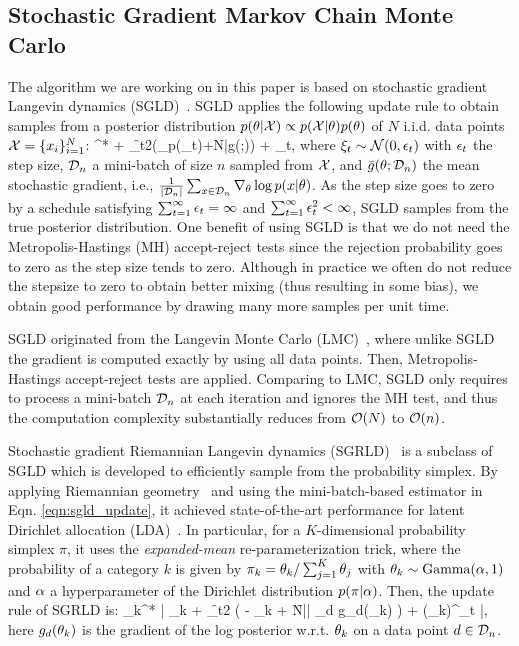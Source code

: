 \subsection{Stochastic Gradient Markov Chain Monte Carlo}
The algorithm we are working on in this paper is based on stochastic gradient Langevin dynamics (SGLD)~\cite{welling2011bayesian}. SGLD applies the following update rule to obtain samples from a posterior distribution $p(\ta|\cX) \propto p(\cX|\ta) p(\ta)$ of $N$ i.i.d. data points $\cX=\{x_i\}_{i=1}^{N}$:
\bea
\ta^* \law \ta + \f{\epsilon_t}{2}\left(\nabla_{\ta}\log p(\ta_t)+N\bar{g}(\ta;\SGLDMinibatch)\right) + \xi_t, \label{eqn:sgld_update}
\eea
where $\xi_t \sim \cN(0,\epsilon_t )$ with $\epsilon_t$ the step size, $\SGLDMinibatch$ a mini-batch of size $n$ sampled from $\cX$, and $\bar{g}(\ta;\SGLDMinibatch)$ the mean stochastic gradient, i.e., $\frac{1}{|\SGLDMinibatch|}\sum_{x\in \SGLDMinibatch}^{}\grad_{\ta} \log p(x|\ta)$. As the step size goes to zero by a schedule satisfying $\sum_{t=1}^{\infty}\epsilon_t = \infty$ and $\sum_{t=1}^{\infty}\epsilon_t^2 < \infty$, SGLD samples from the true posterior distribution. One benefit of using SGLD is that we do not need the Metropolis-Hastings (MH) accept-reject tests since the rejection probability goes to zero as the step size tends to zero. Although in practice we often do not reduce the stepsize to zero to obtain better mixing (thus resulting in some bias), we obtain good performance by drawing many more samples per unit time. 

SGLD originated from the Langevin Monte Carlo (LMC)~\cite{girolami2011riemann}, where unlike SGLD the gradient is computed exactly by using all data points. Then, Metropolis-Hastings accept-reject tests are applied. Comparing to LMC, SGLD only requires to process a mini-batch $\SGLDMinibatch$ at each iteration and ignores the MH test, and thus the computation complexity substantially reduces from $\cO(N)$ to $\cO(n)$.   

Stochastic gradient Riemannian Langevin dynamics (SGRLD)~\cite{patterson2013stochastic} is a subclass of SGLD which is developed to efficiently sample from the probability simplex. By applying Riemannian geometry~\cite{girolami2011riemann} and using the mini-batch-based estimator in Eqn. \ref{eqn:sgld_update}, it achieved state-of-the-art performance for latent Dirichlet allocation (LDA)~\cite{blei2003latent}. In particular, for a $K$-dimensional probability simplex $\pi$, it uses the \textit{expanded-mean} re-parameterization trick, where the probability of a category $k$ is given by $\pi_k = \theta_k / \sum_{j=1}^K \theta_j$ with $\theta_k \sim \text{Gamma}(\alpha,1)$ and $\alpha$ a hyperparameter of the Dirichlet distribution $p(\pi | \alpha )$. Then, the update rule of SGRLD is:
\bea
\ta_{k}^* \law \left| \ta_{k} + \f{\ep_t}{2} \left( \al - \ta_{k} + \f{N}{|\SGLDMinibatch|} \sum_{d \in \SGLDMinibatch} g_d(\ta_{k}) \right) + (\ta_{k})^\ha \xi_{t} \right|, \label{eqn:sgrld_update}
\eea
here $g_d(\theta_{k})$ is the gradient of the log posterior w.r.t. $\theta_{k}$ on a data point $d\in \SGLDMinibatch$.


